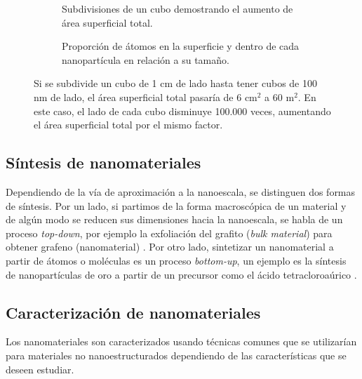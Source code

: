 \begin{figure}[h!]
	\centering
	\begin{subfigure}{\textwidth}
		\caption[Subdivisiones de un cubo demostrando el aumento de área superficial total]{Subdivisiones de un cubo demostrando el aumento de área superficial total.}
		\label{fig:area_cubes}
	\end{subfigure}
	\begin{subfigure}{\textwidth}
			\caption{Proporción de átomos en la superficie y dentro de cada nanopartícula en relación a su tamaño.}
			\label{fig:graph_nanocube}
	\end{subfigure}
	\caption[Aumento de área superficial y proporción de átomos en superficie al disminuir el tamaño de las nanopartículas]{Si se subdivide un cubo de 1 cm de lado hasta tener cubos de 100 nm de lado, el área superficial total pasaría de 6 $\mathrm{cm^2}$ a 60 $\mathrm{m^2}$. En este caso, el lado de cada cubo disminuye 100.000 veces, aumentando el área superficial total por el mismo factor.}
\end{figure}

\subsection{Síntesis de nanomateriales}
Dependiendo de la vía de aproximación a la nanoescala, se distinguen dos formas de síntesis. Por un lado, si partimos de la forma macroscópica de un material y de algún modo se reducen sus dimensiones hacia la nanoescala, se habla de un proceso \textit{top-down}, por ejemplo la exfoliación del grafito (\textit{bulk material}) para obtener grafeno (nanomaterial) \citep{Novoselov2004}.  Por otro lado, sintetizar un nanomaterial a partir de átomos o moléculas es un proceso \textit{bottom-up}, un ejemplo es la síntesis de nanopartículas de oro a partir de un precursor como el ácido tetracloroaúrico \citep{Daniel2004}.

\subsection{Caracterización de nanomateriales}
Los nanomateriales son caracterizados usando técnicas comunes que se utilizarían para materiales no nanoestructurados dependiendo de las características que se deseen estudiar.
